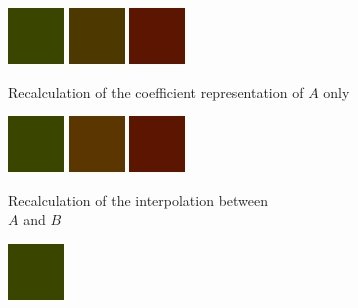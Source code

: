 \begin{figure}[t!]
	\centering
	\captionsetup[subfigure]{font=footnotesize,labelfont=footnotesize}
	\captionsetup[subfigure]{justification=centering}
	\begin{subfigure}[t]{0.30\textwidth}
		\includegraphics[width=1\linewidth,height=4em]{img/recalculation_color_green.png}
		\includegraphics[width=1\linewidth,height=4em]{img/recalculation_color_fitGreen.png}
		\includegraphics[width=1\linewidth,height=4em]{img/recalculation_color_red.png}
		\caption{Recalculation of the coefficient representation of $A$ only}
		\label{fig:recalculation_colorGradients_green}
	\end{subfigure}
	\begin{subfigure}[t]{0.30\textwidth}
		\includegraphics[width=1\linewidth,height=4em]{img/recalculation_color_green.png}
		\includegraphics[width=1\linewidth,height=4em]{img/recalculation_color_interpolated.png}
		\includegraphics[width=1\linewidth,height=4em]{img/recalculation_color_red.png}
		\caption{Recalculation of the interpolation between\\ $A$ and $B$}
		\label{fig:recalculation_colorGradients_interpolated}
	\end{subfigure}
	\begin{subfigure}[t]{0.30\textwidth}
		\includegraphics[width=1\linewidth,height=4em]{img/recalculation_color_green.png}

\end{subfigure}
\end{figure}
